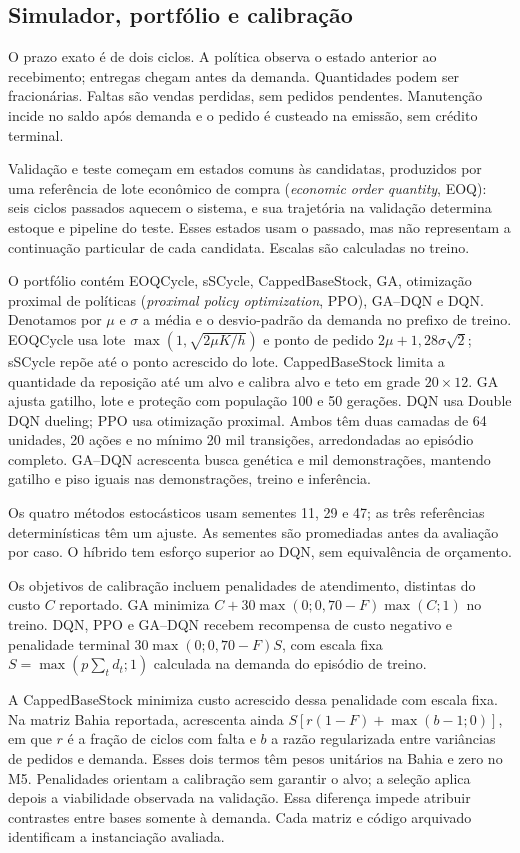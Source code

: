 \documentclass[preprint,12pt]{elsarticle}
\begin{document}
\subsection{Simulador, portfólio e calibração}
O prazo exato é de dois ciclos. A política observa o estado anterior ao recebimento; entregas chegam antes da demanda. Quantidades podem ser fracionárias. Faltas são vendas perdidas, sem pedidos pendentes. Manutenção incide no saldo após demanda e o pedido é custeado na emissão, sem crédito terminal.

Validação e teste começam em estados comuns às candidatas, produzidos por uma referência de lote econômico de compra (\textit{economic order quantity}, EOQ): seis ciclos passados aquecem o sistema, e sua trajetória na validação determina estoque e pipeline do teste. Esses estados usam o passado, mas não representam a continuação particular de cada candidata. Escalas são calculadas no treino.

O portfólio contém EOQCycle, sSCycle, CappedBaseStock, GA, otimização proximal de políticas (\textit{proximal policy optimization}, PPO), GA--DQN e DQN. Denotamos por $\mu$ e $\sigma$ a média e o desvio-padrão da demanda no prefixo de treino. EOQCycle usa lote $\max(1,\sqrt{2\mu K/h})$ e ponto de pedido $2\mu+1{,}28\sigma\sqrt2$; sSCycle repõe até o ponto acrescido do lote. CappedBaseStock limita a quantidade da reposição até um alvo e calibra alvo e teto em grade $20\times12$. GA ajusta gatilho, lote e proteção com população 100 e 50 gerações. DQN usa Double DQN dueling; PPO usa otimização proximal. Ambos têm duas camadas de 64 unidades, 20 ações e no mínimo 20 mil transições, arredondadas ao episódio completo. GA--DQN acrescenta busca genética e mil demonstrações, mantendo gatilho e piso iguais nas demonstrações, treino e inferência.

Os quatro métodos estocásticos usam sementes 11, 29 e 47; as três referências determinísticas têm um ajuste. As sementes são promediadas antes da avaliação por caso. O híbrido tem esforço superior ao DQN, sem equivalência de orçamento.

Os objetivos de calibração incluem penalidades de atendimento, distintas do custo $C$ reportado. GA minimiza $C+30\max(0;0{,}70-F)\max(C;1)$ no treino. DQN, PPO e GA--DQN recebem recompensa de custo negativo e penalidade terminal $30\max(0;0{,}70-F)S$, com escala fixa $S=\max(p\sum_t d_t;1)$ calculada na demanda do episódio de treino.

A CappedBaseStock minimiza custo acrescido dessa penalidade com escala fixa. Na matriz Bahia reportada, acrescenta ainda $S[r(1-F)+\max(b-1;0)]$, em que $r$ é a fração de ciclos com falta e $b$ a razão regularizada entre variâncias de pedidos e demanda. Esses dois termos têm pesos unitários na Bahia e zero no M5. Penalidades orientam a calibração sem garantir o alvo; a seleção aplica depois a viabilidade observada na validação. Essa diferença impede atribuir contrastes entre bases somente à demanda. Cada matriz e código arquivado identificam a instanciação avaliada.
\end{document}
